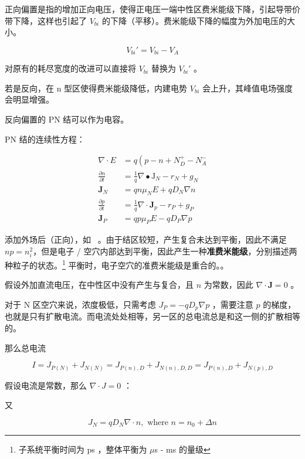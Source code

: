\documentclass[cn,11pt,chinese,black,simple]{../elegantbook}
\begin{document}
正向偏置是指的增加正向电压，使得正电压一端中性区费米能级下降，引起导带价带下降，这样也引起了 \(V_{bi}\) 的下降（平移）。费米能级下降的幅度为外加电压的大小。

\[V_{bi}' = V_{bi} - V_A\]

对原有的耗尽宽度的改进可以直接将 \(V_{bi}\) 替换为 \(V_{bi}'\) 。

若是反向，在 n 型区使得费米能级降低，内建电势 \(V_{bi}\) 会上升，其峰值电场强度会明显增强。

反向偏置的 PN 结可以作为电容。

PN 结的连续性方程：

\[
    \begin{aligned}
        \nabla \cdot E&=q\left(p-n+N_{D}^{+}-N_{A}^{-}\right.\\
        \frac{\partial n}{\partial t}&=\frac{1}{q} \nabla \bullet \mathrm{J}_{N}-r_{N}+g_{N}\\
        \mathbf{J}_{N}&=q n \mu_{N} E+q D_{N} \nabla n\\
        \frac{\partial p}{\partial t}&=\frac{1}{q} \nabla \cdot \mathbf{J}_{p}-r_{P}+g_{P}\\
        \mathbf{J}_{P}&=q p \mu_{P} E-q D_{P} \nabla p
        \end{aligned}
\]

添加外场后（正向），如 ~。由于结区较短，产生复合未达到平衡，因此不满足 \(n p = n_i^2\)，但是电子 / 空穴内部达到平衡，因此产生一种\textbf{准费米能级}，分别描述两种粒子的状态。\footnote{子系统平衡时间为 ps ，整体平衡为 \(\mu\)s - ms 的量级} 平衡时，电子空穴的准费米能级是重合的。。



假设外加直流电压，在中性区中没有产生与复合，且 \(n\) 为常数，因此 \(\nabla \cdot \mathbf{J} = 0\) 。

对于 N 区空穴来说，浓度极低，只需考虑 \(J_{P} = - q D_p \nabla p\) ，需要注意 \(p\) 的梯度，也就是只有扩散电流。而电流处处相等，另一区的总电流总是和这一侧的扩散相等的。

那么总电流

\[I = J_{P(N)} + J_{N(N)} = J_{P(n),D} + J_{N(n),D,D} = J_{P(n), D} + J_{N(p),D}\]

假设电流是常数，那么 \(\nabla \cdot J = 0\) ：

又

\[J_N = q D_N \nabla \cdot n, \text{ where } n = n_0 + \Delta n\]
\end{document}
